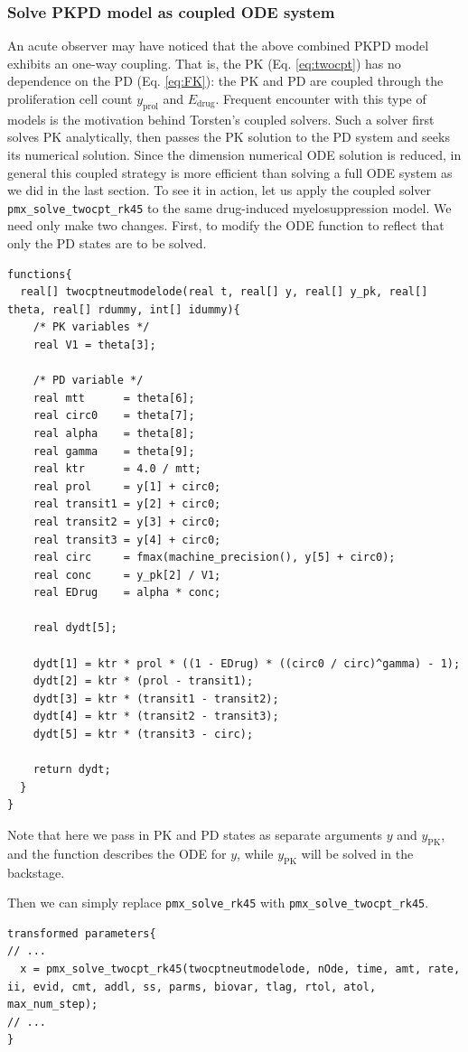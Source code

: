\subsubsection{Solve PKPD model as coupled ODE system}
An acute observer may have noticed that the above combined PKPD model
exhibits an one-way coupling. That is, the PK (Eq. \eqref{eq:twocpt})
has no dependence on the PD (Eq. \eqref{eq:FK}): the PK and PD are
coupled through the proliferation cell count
$y_{\text{prol}}$ and $E_{\text{drug}}$. Frequent encounter with this
type of models is the motivation behind Torsten's coupled solvers.
Such a solver first solves PK analytically, then
passes the PK solution to the PD system and seeks its numerical
solution. Since the dimension numerical ODE solution is reduced, in general this coupled strategy is more efficient than
solving a full ODE system as we did in the last section.
To see it in action, let us apply the
coupled solver \texttt{pmx\_solve\_twocpt\_rk45} to the same drug-induced
myelosuppression model. We need only make two changes. First, to
modify the ODE function to reflect that only the PD states are to be solved.
\begin{lstlisting}[style=stan, numbers=none] 
functions{
  real[] twocptneutmodelode(real t, real[] y, real[] y_pk, real[] theta, real[] rdummy, int[] idummy){
    /* PK variables */
    real V1 = theta[3];

    /* PD variable */
    real mtt      = theta[6];
    real circ0    = theta[7];
    real alpha    = theta[8];
    real gamma    = theta[9];
    real ktr      = 4.0 / mtt;
    real prol     = y[1] + circ0;
    real transit1 = y[2] + circ0;
    real transit2 = y[3] + circ0;
    real transit3 = y[4] + circ0;
    real circ     = fmax(machine_precision(), y[5] + circ0);
    real conc     = y_pk[2] / V1;
    real EDrug    = alpha * conc;

    real dydt[5];

    dydt[1] = ktr * prol * ((1 - EDrug) * ((circ0 / circ)^gamma) - 1);
    dydt[2] = ktr * (prol - transit1);
    dydt[3] = ktr * (transit1 - transit2);
    dydt[4] = ktr * (transit2 - transit3);
    dydt[5] = ktr * (transit3 - circ);

    return dydt;
  }
}
\end{lstlisting}
Note that here we pass in PK and PD states as separate arguments $y$
and $y_{\text{PK}}$, and the function describes the ODE for $y$, while
$y_{\text{PK}}$ will be solved in the backstage.

Then we can simply replace \texttt{pmx\_solve\_rk45} with
\texttt{pmx\_solve\_twocpt\_rk45}.
\begin{lstlisting}[style=stan, numbers=none] 
transformed parameters{
// ...
  x = pmx_solve_twocpt_rk45(twocptneutmodelode, nOde, time, amt, rate, ii, evid, cmt, addl, ss, parms, biovar, tlag, rtol, atol, max_num_step);
// ...
}
\end{lstlisting}
